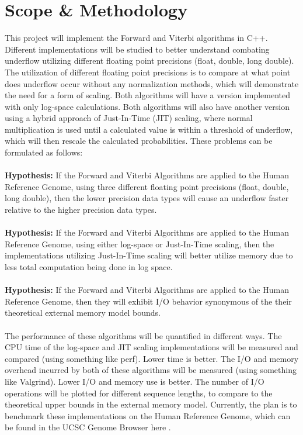 \documentclass{article}
\begin{document}
\section{Scope \& Methodology}
This project will implement the Forward and Viterbi algorithms in C++. Different implementations will be studied to better understand combating underflow utilizing different floating point precisions (float, double, long double). The utilization of different floating point precisions is to compare at what point does underflow occur without any normalization methods, which will demonstrate the need for a form of scaling. Both algorithms will have a version implemented with only log-space calculations. Both algorithms will also have another version using a hybrid approach of Just-In-Time (JIT) scaling, where normal multiplication is used until a calculated value is within a threshold of underflow,  which will then rescale the calculated probabilities. These problems can be formulated as follows: \\ \\
\textbf{Hypothesis:} If the Forward and Viterbi Algorithms are applied to the Human Reference Genome, using three different floating point precisions (float, double, long double), then the lower precision data types will cause an underflow faster relative to the higher precision data types. \\\\
\textbf{Hypothesis:} If the Forward and Viterbi Algorithms are applied to the Human Reference Genome, using either log-space or Just-In-Time scaling, then the implementations utilizing Just-In-Time scaling will better utilize memory due to less total computation being done in log space. \\\\
\textbf{Hypothesis:} If the Forward and Viterbi Algorithms are applied to the Human Reference Genome, then they will exhibit I/O behavior synonymous of the their theoretical external memory model bounds. \\\\

The performance of these algorithms will be quantified in different ways. The CPU time of the log-space and JIT scaling implementations will be measured and compared (using something like perf). Lower time is better. The I/O and memory overhead incurred by both of these algorithms will be measured (using something like Valgrind). Lower I/O and memory use is better. The number of I/O operations will be plotted for different sequence lengths, to compare to the theoretical upper bounds in the external memory model. Currently, the plan is to benchmark these implementations on the Human Reference Genome, which can be found in the UCSC Genome Browser here \cite {Kent2002}\cite{Miga697-707}. 
\end{document}
